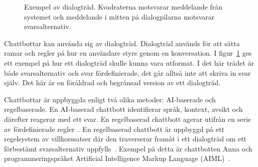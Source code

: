 \documentclass[a4paper,12pt]{article}
\begin{document}
\begin{figure}[H]
    \centering
    \smallskip
    \smallskip
    \caption{Exempel av dialogträd. Kvadraterna motsvarar meddelande från systemet och meddelande i mitten på dialogpilarna motsvarar svarsalternativ.}
    \label{fig:chattbottar:dialogtree}
\end{figure}
Chattbottar kan använda sig av dialogträd. Dialogträd används för att sätta ramar och regler på hur en användare styrs genom en konversation.
I figur~\ref{fig:chattbottar:dialogtree} ges ett exempel på hur ett dialogträd skulle kunna vara utformat. I det här trädet är både svarsalternativ och svar fördefinierade, det går alltså inte att skriva in svar själv. 
Det här är en föråldrad och begränsad version av ett dialogträd. 


Chattbottar är uppbyggda enligt två olika metoder: AI-baserade och regelbaserade. En AI-baserad chattbott identifierar språk, kontext, avsikt och därefter reagerar med ett svar. En regelbaserad chattbott agerar utifrån en serie av fördefinierade regler~\cite{web:chatbotmagazine-nilima-shah}. En regelbaserad chattbott är uppbyggd på ett regelsystem av villkorssatser där den traverserar framåt i ett dialogträd om ett förbestämt svarsalternativ uppfylls~\cite{web:medium-kumar-shridhar}. Exempel på detta är chattbotten Anna och programmeringspråket Artificial Intelligence Markup Language (AIML)~\cite{web:AIML-anna, web:medium-kumar-shridhar}. 
\end{document}
